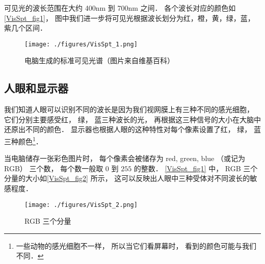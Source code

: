 
可见光的波长范围在大约 400nm 到 700nm 之间． 各个波长对应的颜色如\autoref{VisSpt_fig1}， 图中我们进一步将可见光根据波长划分为红，橙，黄，绿，蓝，紫几个区间．

\begin{figure}[ht]
\centering
\texttt{[image: ./figures/VisSpt\_1.png]}
\caption{电脑生成的标准可见光谱（图片来自维基百科）} \label{VisSpt_fig1}
\end{figure}

\subsection{人眼和显示器}
我们知道人眼可以识别不同的波长是因为我们视网膜上有三种不同的感光细胞， 它们分别主要感受红， 绿， 蓝三种波长的光， 再根据这三种信号的大小在大脑中还原出不同的颜色． 显示器也根据人眼的这种特性对每个像素设置了红， 绿， 蓝三种颜色\footnote{一些动物的感光细胞不一样， 所以当它们看屏幕时， 看到的颜色可能与我们不同．}．

当电脑储存一张彩色图片时， 每个像素会被储存为 red, green, blue （或记为 RGB） 三个数， 每个数一般取 $0$ 到 $255$ 的整数． \autoref{VisSpt_fig1} 中， RGB 三个分量的大小如\autoref{VisSpt_fig2} 所示， 这可以反映出人眼中三种受体对不同波长的敏感程度．

\begin{figure}[ht]
\centering
\texttt{[image: ./figures/VisSpt\_2.png]}
\caption{RGB 三个分量} \label{VisSpt_fig2}
\end{figure}
